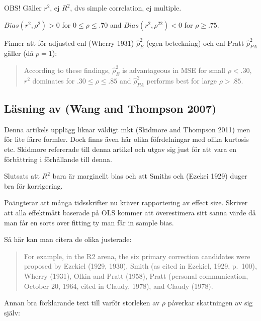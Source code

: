 \documentclass[]{article}
\begin{document}
OBS! Gäller \(r^2\), ej \(R^2\), dvs simple correlation, ej multiple.

\(Bias(r^2, \rho^2) > 0\) for \(0 \leq \rho \leq .70\) and
\(Bias(r^2, \rho^22) < 0\) for \(\rho \geq .75\).

Finner att för adjusted enl (Wherry 1931) \(\hat{\rho}_E^2\) (egen
beteckning) och enl Pratt \(\hat{\rho}^2_{PA}\) gäller (då \(p = 1\)):

\begin{quote}
According to these findings, \(\hat{\rho}_E^2\) is advantageous in MSE
for small \(\rho <.30\), \(r^2\) dominates for \(.30\leq \rho \leq .85\)
and \(\hat{\rho}^2_{PA}\) performs best for large \(\rho > .85\).
\end{quote}

\subsection{Läsning av (Wang and Thompson
2007)}\label{lasning-av-wang2007}

Denna artikels upplägg liknar väldigt mkt (Skidmore and Thompson 2011)
men för lite färre formler. Dock finns även här olika föfrdelningar med
olika kurtosis etc. Skidmore refererade till denna artikel och utgav sig
just för att vara en förbättring i förhållande till denna.

Slutsats att \(R^2\) bara är marginellt bias och att Smiths och (Ezekei
1929) duger bra för korrigering.

Poängterar att många tidsskrifter nu kräver rapportering av effect size.
Skriver att alla effektmått baserade på OLS kommer att överestimera sitt
sanna värde då man får en sorts over fitting ty man får in sample bias.

Så här kan man citera de olika justerade:

\begin{quote}
For example, in the R2 arena, the six primary correction candidates were
proposed by Ezekiel (1929, 1930), Smith (as cited in Ezekiel, 1929,
p.~100), Wherry (1931), Olkin and Pratt (1958), Pratt (personal
communication, October 20, 1964, cited in Claudy, 1978), and Claudy
(1978).
\end{quote}

Annan bra förklarande text till varför storleken av \(\rho\) påverkar
skattningen av sig själv:
\end{document}
